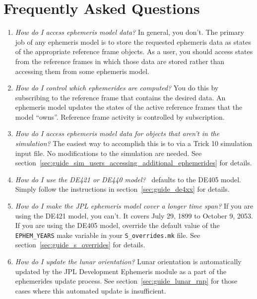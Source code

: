 \section{Frequently Asked Questions}
\label{sec:guide_FAQ}
\begin{enumerate}
\item \emph{How do I access ephemeris model data?}\newline
In general, you don't. The primary job of any ephemeris model is to store
the requested ephemeris data as  states of the appropriate reference frame
objects.
As a user, you should access states from the reference frames in which
those data are stored rather than accessing them from some ephemeris model.

\item \emph{How do I control which ephemerides are computed?}\newline
You do this by subscribing to the reference frame that contains the desired
data. An ephemeris model updates the states of the active reference frames
that the model ``owns''. Reference frame activity is controlled by
subscription.

\item \emph{How do I access ephemeris model data for objects
that aren't in the simulation?}\newline
The easiest way to accomplish this is to via a Trick 10 simulation input file.
No modifications to the simulation are needed.
See section~\ref{sec:guide_sim_users_accessing_additional_ephemerides}
for details.

\item \emph{How do I use the DE421 or DE440 model?}\newline
\JEODid\ defaults to the DE405 model. Simply follow the instructions in
section~\ref{sec:guide_de4xx} for details.

\item \emph{How do I make the JPL ephemeris model cover a longer time span?}
\newline
If you are using the DE421 model, you can't. It covers July 29, 1899 to
October 9, 2053. If you are using the DE405 model,
override the default value of the \verb|EPHEM_YEARS| make variable
in your \verb|S_overrides.mk| file.
See section~\ref{sec:guide_s_overrides} for details.

\item \emph{How do I update the lunar orientation?}\newline
Lunar orientation is automatically updated by the JPL Development Ephemeris
module as a part of the ephemerides update process.
See section~\ref{sec:guide_lunar_rnp} for those cases where this
automated update is insufficient.
\end{enumerate}
